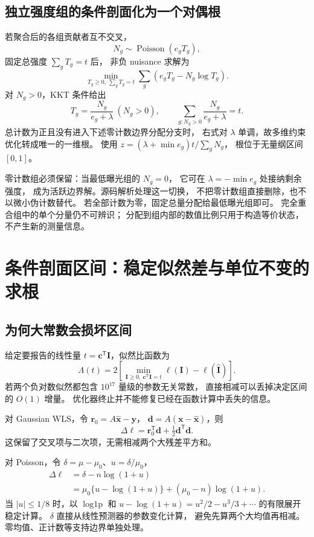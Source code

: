 \documentclass[UTF8,11pt,a4paper,fontset=fandol]{ctexart}
\newcommand{\T}{^{\mathsf T}}
\begin{document}
\subsection{独立强度组的条件剖面化为一个对偶根}

若聚合后的各组贡献者互不交叉，
\[
N_g\sim\operatorname{Poisson}(e_gT_g),
\]
固定总强度 $\sum_gT_g=t$ 后，
非负 nuisance 求解为
\[
\min_{T_g\ge0,\ \sum_gT_g=t}
\sum_g(e_gT_g-N_g\log T_g).
\]
对 $N_g>0$，KKT 条件给出
\begin{equation}
T_g=\frac{N_g}{e_g+\lambda}\ (N_g>0),\qquad
\sum_{g:N_g>0}\frac{N_g}{e_g+\lambda}=t .
\label{eq:dual}
\end{equation}
总计数为正且没有进入下述零计数边界分配分支时，
右式对 $\lambda$ 单调，故多维约束优化转成唯一的一维根。
使用
$z=(\lambda+\min e_g)t/\sum_gN_g$，
根位于无量纲区间 $[0,1]$。

零计数组必须保留：当最低曝光组的 $N_g=0$，
它可在 $\lambda=-\min e_g$ 处接纳剩余强度，
成为活跃边界解。源码解析处理这一切换，
不把零计数组直接删除，也不以微小伪计数替代。
若全部计数为零，固定总量分配给最低曝光组即可。
完全重合组中的单个分量仍不可辨识；
分配到组内部的数值比例只用于构造等价状态，不产生新的测量信息。

\section{条件剖面区间：稳定似然差与单位不变的求根}

\subsection{为何大常数会损坏区间}

给定要报告的线性量 $t=\bm c\T\bm I$，似然比函数为
\[
\Lambda(t)=2\left[
\min_{\bm I\ge0,\ \bm c\T\bm I=t}\ell(\bm I)-\ell(\widehat{\bm I})\right].
\]
若两个负对数似然都包含 $10^{17}$ 量级的参数无关常数，
直接相减可以丢掉决定区间的 $O(1)$ 增量。
优化器终止并不能修复已经在函数计算中丢失的信息。

对 Gaussian WLS，令
$\bm r_0=A\widehat{\bm x}-\bm y$，
$\bm d=A(\bm x-\widehat{\bm x})$，则
\begin{equation}
\Delta\ell=\bm r_0\T\bm d+\tfrac12\bm d\T\bm d .
\label{eq:gaussdelta}
\end{equation}
这保留了交叉项与二次项，无需相减两个大残差平方和。

对 Poisson，令 $\delta=\mu-\mu_0$、$u=\delta/\mu_0$，
\begin{align}
\Delta\ell
 &=\delta-n\log(1+u)\\
 &=\mu_0\{u-\log(1+u)\}
   +(\mu_0-n)\log(1+u).
\label{eq:poisdelta}
\end{align}
当 $|u|\le1/8$ 时，以 $\operatorname{log1p}$ 和
$u-\log(1+u)=u^2/2-u^3/3+\cdots$ 的有限展开稳定计算。
$\delta$ 直接从线性预测器的参数变化计算，
避免先算两个大均值再相减。零均值、正计数等支持边界单独处理。
\end{document}
